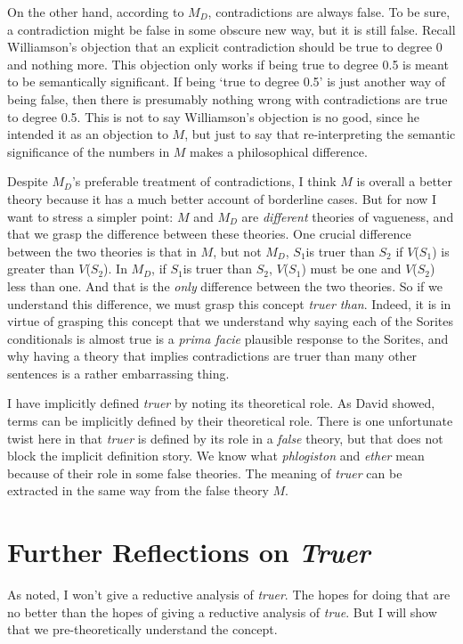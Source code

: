 On the other hand, according to \(M_D\), contradictions are always false. To be sure, a contradiction might be false in some obscure new way, but it is still false. Recall Williamson's objection that an explicit contradiction should be true to degree 0 and nothing more. This objection only works if being true to degree 0.5 is meant to be semantically significant. If being `true to degree 0.5' is just another way of being false, then there is presumably nothing wrong with contradictions are true to degree 0.5. This is not to say Williamson's objection is no good, since he intended it as an objection to \(M\), but just to say that re-interpreting the semantic significance of the numbers in \(M\) makes a philosophical difference.

Despite \(M_D\)'s preferable treatment of contradictions, I think \(M\) is overall a better theory because it has a much better account of borderline cases. But for now I want to stress a simpler point: \(M\) and \(M_D\) are \textit{different} theories of vagueness, and that we grasp the difference between these theories. One crucial difference between the two theories is that in \(M\), but not \(M_D\), \(S_1\)is truer than \(S_2\) if \(V\)(\(S_1\)) is greater than \(V\)(\(S_2\)). In \(M_D\), if \(S_1\)is truer than \(S_2\), \(V\)(\(S_1\)) must be one and \(V\)(\(S_2\)) less than one. And that is the \textit{only }difference between the two theories. So if we understand this difference, we must grasp this concept \textit{truer than}. Indeed, it is in virtue of grasping this concept that we understand why saying each of the Sorites conditionals is almost true is a \textit{prima facie} plausible response to the Sorites, and why having a theory that implies contradictions are truer than many other sentences is a rather embarrassing thing. 

I have implicitly defined \textit{truer} by noting its theoretical role. As David \citet{Lewis1972a} showed, terms can be implicitly defined by their theoretical role. There is one unfortunate twist here in that \textit{truer} is defined by its role in a \textit{false} theory, but that does not block the implicit definition story. We know what \textit{phlogiston} and \textit{ether} mean because of their role in some false theories. The meaning of \textit{truer} can be extracted in the same way from the false theory \(M\). 

\section{Further Reflections on \textit{Truer}}
As noted, I won't give a reductive analysis of \textit{truer}. The hopes for doing that are no better than the hopes of giving a reductive analysis of \textit{true}. But I will show that we pre-theoretically understand the concept.

